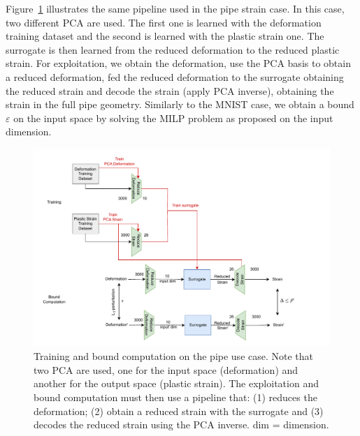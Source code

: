 Figure~\ref{fig.PIPE} illustrates the same pipeline used in the pipe strain case. In this case, two different PCA are used. The first one is learned with the deformation training dataset and the second is learned with the plastic strain one. 
%
The surrogate is then learned from the reduced deformation to the reduced plastic strain. 
%
For exploitation, we obtain the deformation, use the PCA basis to obtain a reduced deformation, fed the reduced deformation to the surrogate obtaining the reduced strain and decode the strain (apply PCA inverse), obtaining the strain in the full pipe geometry. Similarly to the MNIST case, we obtain a bound $\varepsilon$ on the input space by solving the MILP problem as proposed on the input dimension.

\begin{figure}[]
	\centering
	\includegraphics[scale=0.9]{PIPE.pdf} \hspace{1.5cm}
	\caption{Training and bound computation on the pipe use case. Note that two PCA are used, one for the input space (deformation) and another for the output space (plastic strain). The exploitation and bound computation must then use a pipeline that: (1) reduces the deformation; (2) obtain a reduced strain with the surrogate and (3) decodes the reduced strain using the PCA inverse. dim = dimension.}
	\label{fig.PIPE}
\end{figure}	
